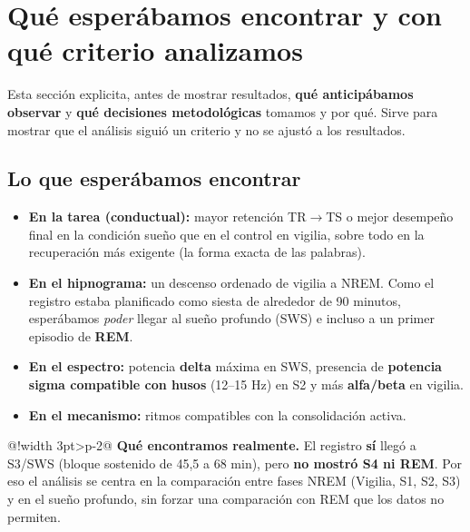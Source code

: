 \documentclass[11pt,a4paper]{article}
\makeatletter
\newcommand{\cajaW}{\dimexpr\linewidth-3pt-2\tabcolsep-1pt\relax}
\newenvironment{clavebox}{%
  \par\smallskip\noindent
  \begin{tabular}{@{}!{\color{amber}\vrule width 3pt}>{\columncolor{amber!10}\color{ink}}p{\cajaW}@{}}}%
  {\end{tabular}\par\smallskip}
\makeatother
\begin{document}
\section{Qué esperábamos encontrar y con qué criterio analizamos}
Esta sección explicita, antes de mostrar resultados, \textbf{qué anticipábamos observar}
y \textbf{qué decisiones metodológicas} tomamos y por qué. Sirve para mostrar que el
análisis siguió un criterio y no se ajustó a los resultados.

\subsection{Lo que esperábamos encontrar}
\begin{itemize}
  \item \textbf{En la tarea (conductual):} mayor retención TR$\to$TS o mejor desempeño final
        en la condición sueño que en el control en vigilia, sobre todo en la recuperación más
        exigente (la forma exacta de las palabras).
  \item \textbf{En el hipnograma:} un descenso ordenado de vigilia a NREM. Como el registro
        estaba planificado como siesta de alrededor de 90 minutos, esperábamos \emph{poder} llegar al
        sueño profundo (SWS) e incluso a un primer episodio de \textbf{REM}.
  \item \textbf{En el espectro:} potencia \textbf{delta} máxima en SWS, presencia de
        \textbf{potencia sigma compatible con husos} (12--15 Hz) en S2 y más \textbf{alfa/beta} en vigilia.
  \item \textbf{En el mecanismo:} ritmos compatibles con la consolidación activa.
\end{itemize}

\begin{clavebox}
\textbf{Qué encontramos realmente.} El registro \textbf{sí} llegó a S3/SWS (bloque
sostenido de 45,5 a 68 min), pero \textbf{no mostró S4 ni REM}. Por eso el análisis se
centra en la comparación entre fases NREM (Vigilia, S1, S2, S3) y en el sueño profundo,
sin forzar una comparación con REM que los datos no permiten.
\end{clavebox}
\end{document}
